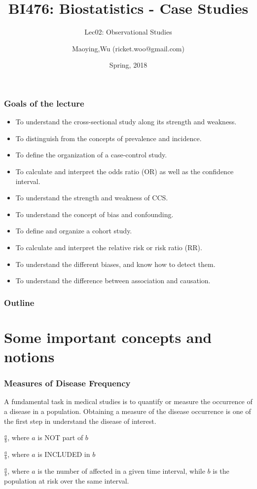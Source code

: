 \documentclass[table,10pt]{beamer}
\title[BI476]{BI476: Biostatistics - Case Studies}
\subtitle[observation]{Lec02: Observational Studies}
\author[Maoying Wu]{Maoying,Wu ({\small ricket.woo@gmail.com})}
\institute[CBB] %
{
  \inst{}
  Dept. of Bioinformatics \& Biostatistics\\
  Shanghai Jiao Tong University
}
\date{Spring, 2018}
\begin{document}
\begin{CJK*}{UTF8}{gbsn}

\frame{\titlepage}

\begin{frame}
\frametitle{Goals of the lecture}
\begin{itemize}[<+->]
	\item To understand the cross-sectional study along its strength and weakness.
	\item To distinguish from the concepts of prevalence and incidence.
	\item To define the organization of a case-control study.
	\item To calculate and interpret the odds ratio (OR) as well as the confidence interval.
	\item To understand the strength and weakness of CCS.
	\item To understand the concept of bias and confounding.
	\item To define and organize a cohort study.
	\item To calculate and interpret the relative risk or risk ratio (RR).
	\item To understand the different biases, and know how to detect them.
	\item To understand the difference between association and causation.
\end{itemize}
\end{frame}

\begin{frame}
\frametitle{Outline}
	\tableofcontents
\end{frame}


\section{Some important concepts and notions}


\begin{frame}[t]
\frametitle{Measures of Disease Frequency}
A fundamental task in medical studies is to quantify or measure the \alert{occurrence of 
a disease in a population}. Obtaining a measure of the disease occurrence is one of the 
first step in understand the disease of interest.
\begin{description}[<+->]
	\item[\alert{Ratios}]{$\frac{a}{b}$, where $a$ is NOT part of $b$}
	\item[\alert{Proportions}]{$\frac{a}{b}$, where $a$ is INCLUDED in $b$}
	\item[\alert{Rates}]{$\frac{a}{b}$, where $a$ is the number of affected in a given time 
		interval, while $b$ is the population at risk over the same interval.}
\end{description}
\end{frame}


\end{CJK*}
\end{document}
